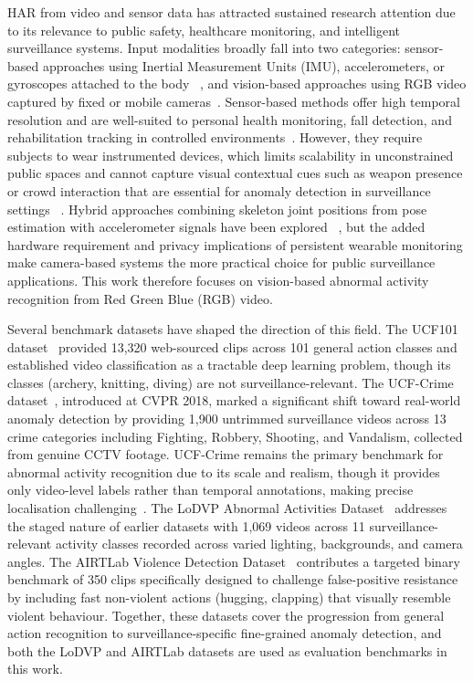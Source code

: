 \documentclass[11pt,a4paper]{article}
\begin{document}
	HAR from video and sensor data has attracted sustained research attention due to its 
	relevance to public safety, healthcare monitoring, and intelligent surveillance systems.
	Input modalities broadly fall into two categories: sensor-based approaches using Inertial
	Measurement Units (IMU), accelerometers, or gyroscopes attached to the body
	~\cite{talukder2024cnn_convlstm_lrcn, frontiers_wearable_cnn2024}, and vision-based 
	approaches using RGB video captured by fixed or mobile cameras~\cite{vrskova2022, 
	sultani2018}. Sensor-based methods offer high temporal resolution and are 
	well-suited to personal health monitoring, fall detection, and rehabilitation tracking 
	in controlled environments~\cite{frontiers_wearable_cnn2024}. However, they require 
	subjects to wear instrumented devices, which limits scalability in unconstrained public 
	spaces and cannot capture visual contextual cues such as weapon presence or crowd 
	interaction that are essential for anomaly detection in surveillance settings
	~\cite{talukder2024cnn_convlstm_lrcn}. Hybrid approaches combining skeleton joint 
	positions from pose estimation with accelerometer signals have been explored
	~\cite{talukder2024cnn_convlstm_lrcn}, but the added hardware requirement and privacy
	implications of persistent wearable monitoring make camera-based systems the more 
	practical choice for public surveillance applications. This work therefore focuses on 
	vision-based abnormal activity recognition from Red Green Blue (RGB) video.

	Several benchmark datasets have shaped the direction of this field. The UCF101 
	dataset~\cite{soomro2012ucf101} provided 13,320 web-sourced clips across 101 general 
	action classes and established video classification as a tractable deep learning problem,
	though its classes (archery, knitting, diving) are not surveillance-relevant. The 
	UCF-Crime dataset~\cite{soomro2012ucf101}, introduced at CVPR 2018, marked a 
	significant shift toward real-world anomaly detection by providing 1,900 untrimmed
	surveillance videos across 13 crime categories including Fighting, Robbery, Shooting,
	and Vandalism, collected from genuine CCTV footage. UCF-Crime remains the primary
	benchmark for abnormal activity recognition due to its scale and realism, though it
	provides only video-level labels rather than temporal annotations, making precise
	localisation challenging~\cite{soomro2012ucf101}. The LoDVP Abnormal Activities
	Dataset~\cite{vrskova2022} addresses the staged nature of earlier datasets with 1,069
	videos across 11 surveillance-relevant activity classes recorded across varied lighting, 
	backgrounds, and camera angles. The AIRTLab Violence Detection Dataset~\cite{sernani2021}
	contributes a targeted binary benchmark of 350 clips specifically designed to challenge
	false-positive resistance by including fast non-violent actions (hugging, clapping) that
	visually resemble violent behaviour. Together, these datasets cover the progression from
	general action recognition to surveillance-specific fine-grained anomaly detection, and
	both the LoDVP and AIRTLab datasets are used as evaluation benchmarks in this work.
\end{document}
